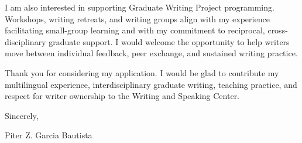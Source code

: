 \documentclass[11pt,letterpaper]{article}
\begin{document}
I am also interested in supporting Graduate Writing Project programming. Workshops, writing retreats, and writing groups align with my experience facilitating small-group learning and with my commitment to reciprocal, cross-disciplinary graduate support. I would welcome the opportunity to help writers move between individual feedback, peer exchange, and sustained writing practice.

Thank you for considering my application. I would be glad to contribute my multilingual experience, interdisciplinary graduate writing, teaching practice, and respect for writer ownership to the Writing and Speaking Center.

Sincerely,

\vspace{0.3in}
Piter Z. Garcia Bautista
\end{document}
